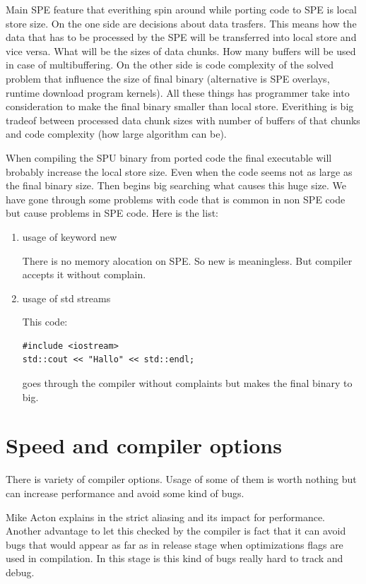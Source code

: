 \par
Main SPE feature that everithing spin around while porting code to SPE is local store size.
On the one side are decisions about data trasfers.
This means how the data that has to be processed by the SPE will be transferred into local store and vice versa.
What will be the sizes of data chunks.
How many buffers will be used in case of multibuffering.
On the other side is code complexity of the solved problem that influence the size of final binary (alternative is SPE overlays, runtime download program kernels).
All these things has programmer take into consideration to make the final binary smaller than local store.
Everithing is big tradeof between processed data chunk sizes with number of buffers of that chunks and code complexity (how large algorithm can be).
\par
When compiling the SPU binary from ported code the final executable will brobably increase the local store size.
Even when the code seems not as large as the final binary size.
Then begins big searching what causes this huge size.
We have gone through some problems with code that is common in non SPE code but cause problems in SPE code.
Here is the list:
\begin{enumerate}
\item usage of keyword new
\par
There is no memory alocation on SPE. So new is meaningless.
But compiler accepts it without complain.

\item usage of std streams
\par
This code:
\begin{verbatim}
#include <iostream>
std::cout << "Hallo" << std::endl;
\end{verbatim}
goes through the compiler without complaints but makes the final binary to big.

\end{enumerate}

\section {Speed and compiler options}

\par
There is variety of compiler options.
Usage of some of them is worth nothing but can increase performance and avoid some kind of bugs.

\par
Mike Acton explains in \cite{strictAliasing} the strict aliasing and its impact for performance.
Another advantage to let this checked by the compiler is fact that it can avoid bugs that would appear as far as in release stage when optimizations flags are used in compilation.
In this stage is this kind of bugs really hard to track and debug.